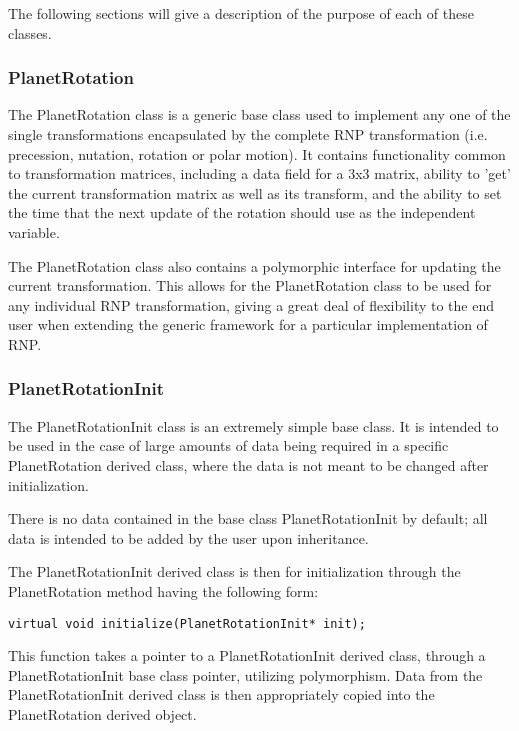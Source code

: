 The following sections will give a description of the purpose of each of
these classes.

\subsubsection{PlanetRotation}

The PlanetRotation class is a generic base class used to implement any one
of the single transformations encapsulated by the complete RNP transformation
(i.e. precession, nutation, rotation or polar motion). It contains
functionality common to transformation matrices, including a data field
for a 3x3 matrix, ability to 'get' the current transformation matrix as well
as its transform, and the ability to set the time that the next update
of the rotation should use as the independent variable.

The PlanetRotation class also contains a polymorphic interface for updating
the current transformation. This allows for the PlanetRotation class to be
used for any individual RNP transformation, giving a great deal of flexibility
to the end user when extending the generic framework for a particular
implementation of RNP.

\subsubsection{PlanetRotationInit}

The PlanetRotationInit class is an extremely simple base class.
It is intended to be used in the case of large amounts of data being
required in a specific PlanetRotation derived class, where the data is
not meant to be changed after initialization.

There is no data contained in the base class PlanetRotationInit by default;
all data is intended to be added by the user upon inheritance.

The PlanetRotationInit derived class is then for initialization through the
PlanetRotation method having the following form:

\begin{verbatim}
virtual void initialize(PlanetRotationInit* init);
\end{verbatim}

This function takes a pointer to a PlanetRotationInit derived class, through
a PlanetRotationInit base class pointer, utilizing polymorphism. Data from
the PlanetRotationInit derived class is then appropriately copied into
the PlanetRotation derived object.

